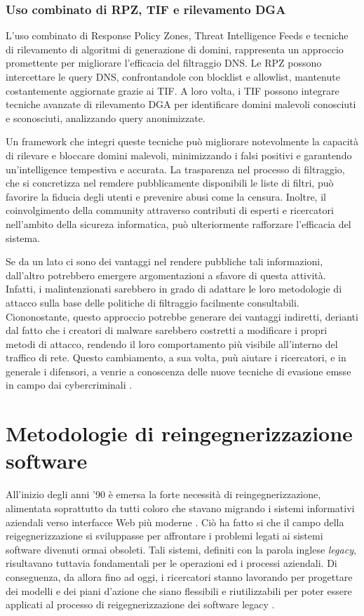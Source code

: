 \subsubsection{Uso combinato di RPZ, TIF e rilevamento DGA}
L'uso combinato di Response Policy Zones, Threat Intelligence Feeds e tecniche di rilevamento di algoritmi di generazione di domini, rappresenta un approccio promettente per migliorare l'efficacia del filtraggio DNS. Le RPZ possono intercettare le query DNS, confrontandole con blocklist e allowlist, mantenute costantemente aggiornate grazie ai TIF. A loro volta, i TIF possono integrare tecniche avanzate di rilevamento DGA per identificare domini malevoli conosciuti e sconosciuti, analizzando query anonimizzate.

Un framework che integri queste tecniche può migliorare notevolmente la capacità di rilevare e bloccare domini malevoli, minimizzando i falsi positivi e garantendo un'intelligence tempestiva e accurata. La trasparenza nel processo di filtraggio, che si concretizza nel remdere pubblicamente disponibili le liste di filtri, può favorire la fiducia degli utenti e prevenire abusi come la censura. Inoltre, il coinvolgimento della community attraverso contributi di esperti e ricercatori nell'ambito della sicureza informatica, può ulteriormente rafforzare l'efficacia del sistema.

Se da un lato ci sono dei vantaggi nel rendere pubbliche tali informazioni, dall'altro potrebbero emergere argomentazioni a sfavore di questa attività. Infatti, i malintenzionati sarebbero in grado di adattare le loro metodologie di attacco sulla base delle politiche di filtraggio facilmente consultabili. Ciononostante, questo approccio potrebbe generare dei vantaggi indiretti, derianti dal fatto che i creatori di malware sarebbero costretti a modificare i propri metodi di attacco, rendendo il loro comportamento più visibile all'interno del traffico di rete. Questo cambiamento, a sua volta, puù aiutare i ricercatori, e in generale i difensori, a venrie a conoscenza delle nuove tecniche di evasione emsse in campo dai cybercriminali \cite{DBLP:journals/corr/abs-2401-03864}.

\section{Metodologie di reingegnerizzazione software}
All'inizio degli anni '90 è emersa la forte necessità di reingegnerizzazione, alimentata soprattutto da tutti coloro che stavano migrando i sistemi informativi aziendali verso interfacce Web più moderne \cite{DBLP:conf/icse/MullerJSSTW00}. Ciò ha fatto si che il campo della reigegnerizzazione si sviluppasse per affrontare i problemi legati ai sistemi software divenuti ormai obsoleti. Tali sistemi, definiti con la parola inglese \emph{legacy}, risultavano tuttavia fondamentali per le operazioni ed i processi aziendali. Di conseguenza, da allora fino ad oggi, i ricercatori stanno lavorando per progettare dei modelli e dei piani d'azione che siano flessibili e riutilizzabili per poter essere applicati al processo di reigegnerizzazione dei software legacy \cite{Majthoub2018}.

